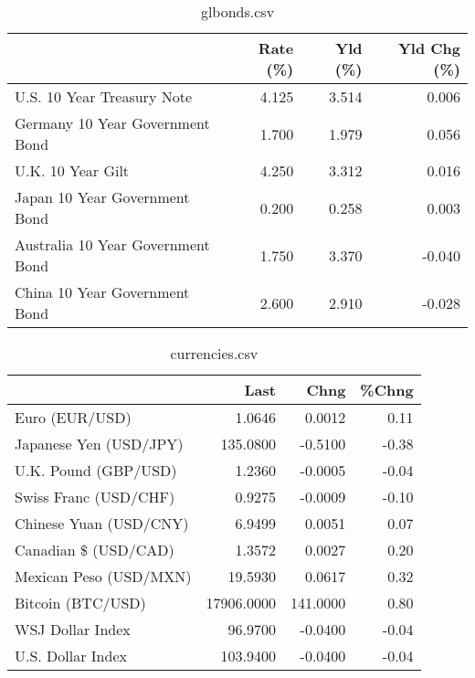 \documentclass{article}%
\begin{document}
%


\begin{table}[htbp]%
\caption{glbonds.csv}%
\centering%
\begin{adjustbox}{width=1\textwidth}%
\begin{tabular}{lrrr}
\toprule
                                  &  Rate (\%) &  Yld (\%) &  Yld Chg (\%) \\
\midrule
       U.S. 10 Year Treasury Note &     4.125 &    3.514 &        0.006 \\
  Germany 10 Year Government Bond &     1.700 &    1.979 &        0.056 \\
                U.K. 10 Year Gilt &     4.250 &    3.312 &        0.016 \\
    Japan 10 Year Government Bond &     0.200 &    0.258 &        0.003 \\
Australia 10 Year Government Bond &     1.750 &    3.370 &       -0.040 \\
    China 10 Year Government Bond &     2.600 &    2.910 &       -0.028 \\
\bottomrule
\end{tabular}
%
\end{adjustbox}%
\end{table}

%


\begin{table}[htbp]%
\caption{currencies.csv}%
\centering%
\begin{adjustbox}{width=1\textwidth}%
\begin{tabular}{lrrr}
\toprule
                       &       Last &     Chng &  \%Chng \\
\midrule
        Euro (EUR/USD) &     1.0646 &   0.0012 &   0.11 \\
Japanese Yen (USD/JPY) &   135.0800 &  -0.5100 &  -0.38 \\
  U.K. Pound (GBP/USD) &     1.2360 &  -0.0005 &  -0.04 \\
 Swiss Franc (USD/CHF) &     0.9275 &  -0.0009 &  -0.10 \\
Chinese Yuan (USD/CNY) &     6.9499 &   0.0051 &   0.07 \\
  Canadian \$ (USD/CAD) &     1.3572 &   0.0027 &   0.20 \\
Mexican Peso (USD/MXN) &    19.5930 &   0.0617 &   0.32 \\
     Bitcoin (BTC/USD) & 17906.0000 & 141.0000 &   0.80 \\
      WSJ Dollar Index &    96.9700 &  -0.0400 &  -0.04 \\
     U.S. Dollar Index &   103.9400 &  -0.0400 &  -0.04 \\
\bottomrule
\end{tabular}
%
\end{adjustbox}%
\end{table}

%
\end{document}
